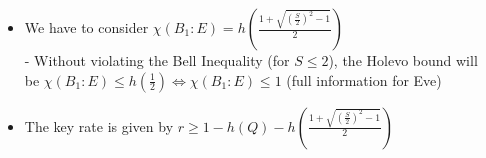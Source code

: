 \documentclass{beamer}
\begin{document}
\begin{frame}
\begin{itemize}
\begin{itemize}
\begin{itemize}
                        \item We have to consider $\chi({B}_{1}:E) = h\left( \frac{1 + \sqrt{{(\frac{S}{2})}^{2} - 1}}{2} \right)$\\ \scriptsize
                        - Without violating the Bell Inequality (for $S \leq 2$), the Holevo bound will\\\hspace{0.5em}be $\chi({B}_{1}:E) \leq h\left(\frac{1}{2}\right) \Leftrightarrow \chi({B}_{1}:E) \leq 1$ (full information for Eve)\\
                        \vspace{1ex}
                        \small
                        \item The key rate is given by $r \geq 1 - h(Q) - h\left( \frac{1 + \sqrt{{(\frac{S}{2})}^{2} - 1}}{2} \right)$
                    \end{itemize}
                \end{itemize}
            \end{itemize}
		\end{frame}
\end{document}
